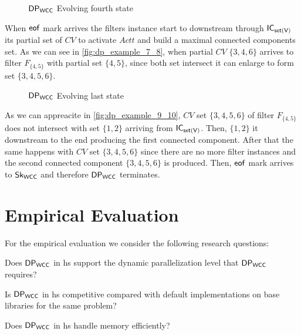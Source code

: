 \begin{figure}[h!]
  \centering
  \caption[$\dpwcc$ Evolving fourth state]{$\dpwcc$ Evolving fourth state}
  \label{fig:dp_example_7_8}
\end{figure}

When $\mathsf{eof}$ mark arrives the filters instance start to downstream through $\mathsf{IC_{set(V)}}$ its partial set of $CV$ to activate $Actt$ and build a maximal connected components set. 
As we can see in \autoref{fig:dp_example_7_8}, when partial $CV$ $\{3,4,6\}$ arrives to filter $F_{\{4,5\}}$ with partial set $\{4,5\}$, since both set intersect it can enlarge to form set $\{3,4,5,6\}$.

\begin{figure}[h!]
  \centering
  \vspace{0.5em}
  \vspace{1.5em}

  \vspace{0.5em}
  \caption[$\dpwcc$ Evolving last state]{$\dpwcc$ Evolving last state}
  \label{fig:dp_example_9_10}
\end{figure}

As we can appreacite in \autoref{fig:dp_example_9_10}, $CV$ set $\{3,4,5,6\}$ of filter $F_{\{4,5\}}$ does not intersect with set $\{1,2\}$ arriving from $\mathsf{IC_{set(V)}}$. Then, $\{1,2\}$ it downstream to the end producing the 
first connected component. After that the same happens with $CV$ set $\{3,4,5,6\}$ since there are no more filter instances and the second connected component $\{3,4,5,6\}$ is produced.
Then, $\mathsf{eof}$ mark arrives to $\mathsf{Sk_{WCC}}$ and therefore $\dpwcc$ terminates.

\section{Empirical Evaluation}
For the empirical evaluation we consider the following research questions: 
\begin{inparaenum}[\bf {\bf RQ}1\upshape)]
\label{res:question}
    \item Does $\dpwcc$ in \acrshort{hs} support the dynamic parallelization level that $\dpwcc$ requires?
    \item Is $\dpwcc$ in \acrshort{hs} competitive compared with default implementations on base libraries for the same problem?
    \item Does $\dpwcc$ in \acrshort{hs} handle memory efficiently?
\end{inparaenum}

